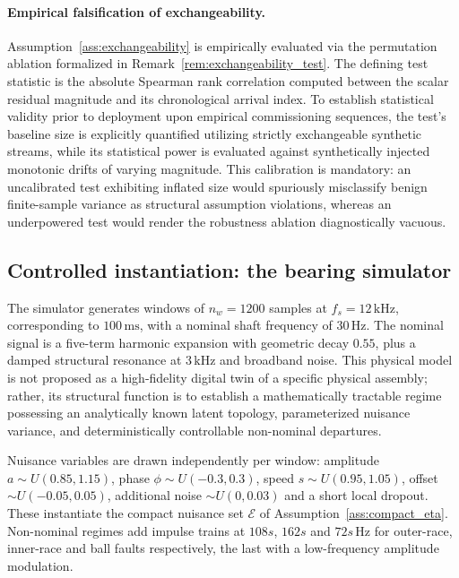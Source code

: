 \documentclass[a4paper]{cas-sc}
\newcommand{\EtaSpace}{\ensuremath{\mathcal{E}}}
\begin{document}
\paragraph{Empirical falsification of exchangeability.}
Assumption~\ref{ass:exchangeability} is empirically evaluated via the permutation ablation formalized in Remark~\ref{rem:exchangeability_test}. The defining test statistic is the absolute Spearman rank correlation computed between the scalar residual magnitude and its chronological arrival index. To establish statistical validity prior to deployment upon empirical commissioning sequences, the test's baseline size is explicitly quantified utilizing strictly exchangeable synthetic streams, while its statistical power is evaluated against synthetically injected monotonic drifts of varying magnitude. This calibration is mandatory: an uncalibrated test exhibiting inflated size would spuriously misclassify benign finite-sample variance as structural assumption violations, whereas an underpowered test would render the robustness ablation diagnostically vacuous.

\subsection{Controlled instantiation: the bearing simulator}
\label{subsec:design_simulator}

The simulator generates windows of \(n_w=1200\) samples at
\(f_s=12\,\mathrm{kHz}\), corresponding to \(100\,\mathrm{ms}\), with a
nominal shaft frequency of \(30\,\mathrm{Hz}\). The nominal signal is a
five-term harmonic expansion with geometric decay \(0.55\), plus a damped
structural resonance at \(3\,\mathrm{kHz}\) and broadband noise. This physical model is not proposed as a high-fidelity digital twin of a specific physical assembly; rather, its structural function is to establish a mathematically tractable regime possessing an analytically known latent topology, parameterized nuisance variance, and deterministically controllable non-nominal departures.

Nuisance variables are drawn independently per window:
amplitude \(a\sim U(0.85,1.15)\), phase \(\phi\sim U(-0.3,0.3)\), speed
\(s\sim U(0.95,1.05)\), offset \(\sim U(-0.05,0.05)\), additional noise
\(\sim U(0,0.03)\) and a short local dropout. These instantiate the compact
nuisance set \(\EtaSpace\) of Assumption~\ref{ass:compact_eta}. Non-nominal
regimes add impulse trains at \(108s\), \(162s\) and \(72s\,\mathrm{Hz}\) for
outer-race, inner-race and ball faults respectively, the last with a
low-frequency amplitude modulation.
\end{document}
